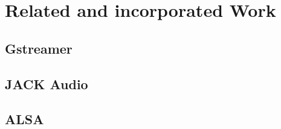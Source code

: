 
\chapter{Related and incorporated Work}

\section{Gstreamer}

\section{JACK Audio}

\section{ALSA}%

